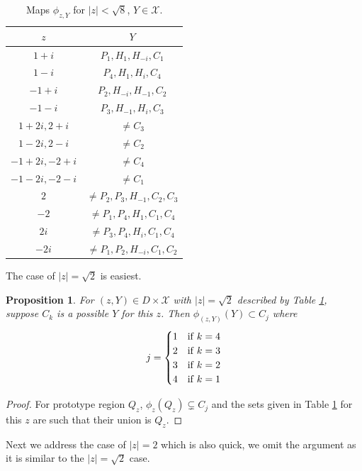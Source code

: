 \documentclass[11pt]{amsart}
\theoremstyle{plain}
\newtheorem{proposition}[theorem]{Proposition}
\theoremstyle{definition}
\renewcommand\~{\tilde}%
\newcommand{\cX}{\ensuremath{\mathcal{X}}}
\numberwithin{equation}{section}
\begin{document}
\begin{center}
\begin{table}[!ht]
\caption{Maps $\phi_{z,Y}$ for $|z|<\sqrt{8}$, $Y\in \cX$.}
\label{tab:1}
\begin{tabular}{|c|c|}
\hline
$z$ & $Y$\\
\hline
$1+i$ & $P_1,H_1,H_{-i},C_1$\\
\hline
$1-i$ & $P_4,H_1,H_i,C_4$\\
\hline
$-1+i$& $P_2,H_{-i},H_{-1},C_2$\\
\hline
$-1-i$& $P_3,H_{-1},H_i,C_3$\\
\hline
$1+2i,2+i$ & $\neq C_3$\\
\hline
$1-2i,2-i$ & $\neq C_2$\\
\hline
$-1+2i,-2+i$ & $\neq C_4$\\
\hline
$-1-2i,-2-i$ & $\neq C_1$\\
\hline
$2$ & $\neq P_2,P_3,H_{-1},C_2,C_3$\\
\hline
$-2$ & $\neq P_1,P_4,H_1,C_1,C_4$\\
\hline
$2i$ & $\neq P_3,P_4,H_i,C_1,C_4$\\
\hline
$-2i$ & $\neq P_1,P_2,H_{-i},C_1,C_2$\\
\hline

\end{tabular} 
\end{table}
\end{center}

The case of $|z|=\sqrt{2}$ is easiest.
\begin{proposition}\label{edges4}
    For $(z,Y)\in D\times\cX$ with $|z|=\sqrt{2}$ described by Table \ref{tab:1}, suppose $C_k$ is a possible $Y$ for this $z$. Then $\phi_{(z,Y)}(Y)\subset C_j$ where 
    $$
    j= \begin{cases}
        1& {\rm if\;} k=4\\
        2& {\rm if\;} k=3\\
        3& {\rm if\;} k=2\\
        4& {\rm if\;} k=1\\
    \end{cases}
    $$
\end{proposition}

\begin{proof} 
    For prototype region $Q_z$, $\phi_z(Q_z)\subsetneq C_j$ and the sets given in Table \ref{tab:1} for this $z$ are such that their union is $Q_z$.  
\end{proof}

Next we address the case of $|z|=2$ which is also quick, we omit the argument as it is similar to the $|z| = \sqrt{2}$ case.
\end{document}
